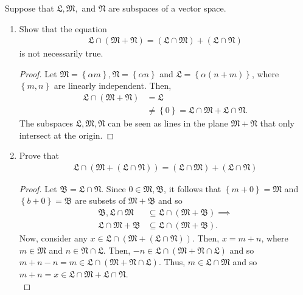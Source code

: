 \documentclass[12pt]{article}
\newenvironment{problem}[2][Problem]{\begin{trivlist} \item[\hskip \labelsep {\bfseries #1}\hskip \labelsep {\bfseries #2.}]}{\end{trivlist}}
\begin{document}
\begin{problem}{5}
  Suppose that $\mathfrak{L},\mathfrak{M},$ and $\mathfrak{N}$ are subspaces of a vector space.
\begin{enumerate}
  \item Show that the equation 
\begin{align*}
  \mathfrak{L}\cap (\mathfrak{M}+\mathfrak{N}) = (\mathfrak{L}\cap\mathfrak{M})+ (\mathfrak{L}\cap\mathfrak{N})
\end{align*}
is not necessarily true.
\begin{proof}
  Let $\mathfrak{M} = \left\{ \alpha m \right\}, \mathfrak{N} = \left\{ \alpha n \right\}$ and $\mathfrak{L} = \left\{ \alpha(n+m) \right\}$, where $\left\{ m,n \right\}$ are linearly independent. Then, 
\begin{align*}
  \mathfrak{L}\cap(\mathfrak{M}+\mathfrak{N}) &= \mathfrak{L}\\
  &\neq \left\{ 0 \right\} = \mathfrak{L}\cap \mathfrak{M} + \mathfrak{L}\cap \mathfrak{N}.
\end{align*}
The subspaces $\mathfrak{L},\mathfrak{M},\mathfrak{N}$ can be seen as lines in the plane $\mathfrak{M}+\mathfrak{N}$ that only intersect at the origin.
\end{proof}
\item Prove that 
\begin{align*}
  \mathfrak{L}\cap(\mathfrak{M}+(\mathfrak{L}\cap\mathfrak{N})) = (\mathfrak{L}\cap \mathfrak{M}) + (\mathfrak{L}\cap \mathfrak{N})
\end{align*}
\begin{proof}
  Let $\mathfrak{B} = \mathfrak{L}\cap \mathfrak{N}$. Since $0\in \mathfrak{M},\mathfrak{B}$, it follows that $\left\{ m +0 \right\} = \mathfrak{M}$ and $\left\{b + 0 \right\} = \mathfrak{B}$ are subsets of $\mathfrak{M}+\mathfrak{B}$ and so
\begin{align*}
  \mathfrak{B},  \mathfrak{L}\cap\mathfrak{M} &\subseteq \mathfrak{L}\cap(\mathfrak{M}+\mathfrak{B})\implies\\
  \mathfrak{L}\cap\mathfrak{M} + \mathfrak{B} &\subseteq \mathfrak{L}\cap(\mathfrak{M}+\mathfrak{B}).
\end{align*}
Now, consider any $x\in \mathfrak{L}\cap \left( \mathfrak{M}+\left( \mathfrak{L}\cap\mathfrak{N} \right) \right)$. Then, $x= m+n$, where $m\in \mathfrak{M}$ and $n\in \mathfrak{N}\cap\mathfrak{L}$. Then, $-n \in \mathfrak{L}\cap (\mathfrak{M} + \mathfrak{N}\cap\mathfrak{L})$ and so $m+n-n = m \in \mathfrak{L}\cap\left( \mathfrak{M}+\mathfrak{N}\cap\mathfrak{L} \right)$. Thus, $m\in \mathfrak{L}\cap\mathfrak{M}$ and so $m+n=x\in \mathfrak{L}\cap\mathfrak{M} + \mathfrak{L}\cap\mathfrak{N}$.\\


\end{proof}
\end{enumerate}
\end{problem}
\end{document}
